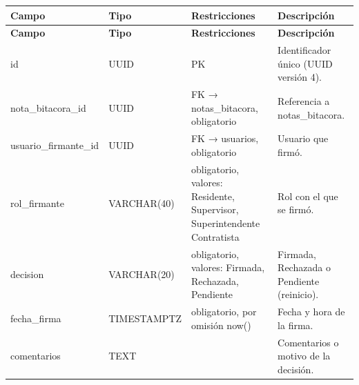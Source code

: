 \begin{xltabular}{\linewidth}{@{}>{\ttfamily\footnotesize}p{4.9cm}>{\ttfamily\footnotesize}p{2.4cm}>{\raggedright\arraybackslash\footnotesize}p{3.3cm}>{\footnotesize}X@{}}
\toprule\normalfont\sffamily\bfseries\footnotesize Campo & \normalfont\sffamily\bfseries\footnotesize Tipo & \sffamily\bfseries Restricciones & \sffamily\bfseries Descripción\\\midrule\endfirsthead
\toprule\normalfont\sffamily\bfseries\footnotesize Campo & \normalfont\sffamily\bfseries\footnotesize Tipo & \sffamily\bfseries Restricciones & \sffamily\bfseries Descripción\\\midrule\endhead
\bottomrule\endfoot
id & UUID & PK & Identificador único (UUID versión 4).\\
nota\_bitacora\_id & UUID & FK → notas\_bitacora, obligatorio & Referencia a notas\_bitacora.\\
usuario\_firmante\_id & UUID & FK → usuarios, obligatorio & Usuario que firmó.\\
rol\_firmante & VARCHAR(40) & obligatorio, valores: Residente, Supervisor, Superintendente Contratista & Rol con el que se firmó.\\
decision & VARCHAR(20) & obligatorio, valores: Firmada, Rechazada, Pendiente & Firmada, Rechazada o Pendiente (reinicio).\\
fecha\_firma & TIMESTAMPTZ & obligatorio, por omisión now() & Fecha y hora de la firma.\\
comentarios & TEXT &  & Comentarios o motivo de la decisión.\\
\end{xltabular}

